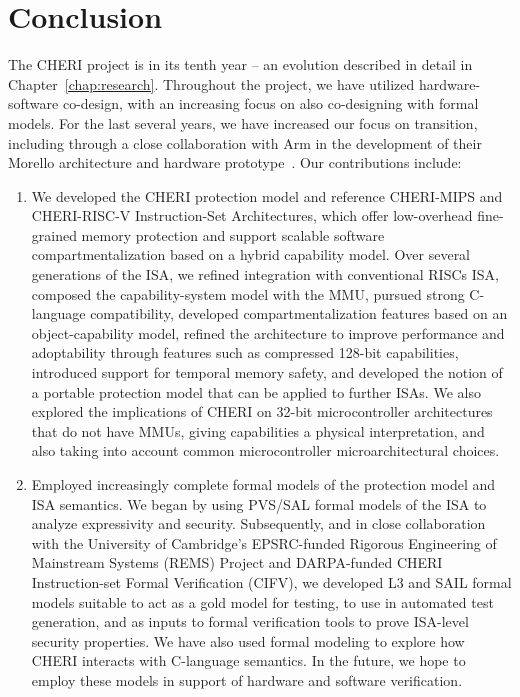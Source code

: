 \chapter{Conclusion}
\label{chap:conclusion}
The CHERI project is in its tenth year -- an evolution described in detail in
Chapter~\ref{chap:research}.
Throughout the project, we have utilized hardware-software co-design, with an
increasing focus on also co-designing with formal models.
For the last several years, we have increased our focus on transition,
including through a close collaboration with Arm in the development of their
Morello architecture and hardware prototype~\cite{arm-morello}.
Our contributions include:

\begin{enumerate}
\item We developed the CHERI protection model and reference CHERI-MIPS and
  CHERI-RISC-V Instruction-Set Architectures, which  offer low-overhead
  fine-grained memory protection and support scalable software
  compartmentalization based on a hybrid capability model.
  Over several generations of the ISA, we refined integration with
  conventional
  RISCs ISA, composed the capability-system model with the MMU, pursued strong
  C-language compatibility, developed compartmentalization features based on
  an object-capability model, refined the architecture to improve performance
  and adoptability through features such as compressed 128-bit capabilities,
  introduced support for temporal memory safety,
  and developed the notion of a portable protection model that can be applied
  to further ISAs.
  We also explored the implications of CHERI on 32-bit microcontroller
  architectures
  that do not have MMUs, giving capabilities a physical interpretation, and
  also taking into account common microcontroller microarchitectural choices.

\item Employed increasingly complete formal models of the protection model and
  ISA semantics.
  We began by using PVS/SAL formal models of the ISA to analyze
  expressivity and security.
  Subsequently, and in close collaboration with the University of Cambridge's
  EPSRC-funded Rigorous Engineering of Mainstream Systems (REMS) Project and
  DARPA-funded CHERI Instruction-set Formal Verification (CIFV), we
  developed L3 and SAIL formal models suitable to act as a gold model for
  testing, to use in automated test generation, and as inputs to formal
  verification tools to prove ISA-level security properties.
  We have also used formal modeling to explore how CHERI interacts with
  C-language semantics.
  In the future, we hope to employ these models in support of hardware and
  software verification.


\end{enumerate}
